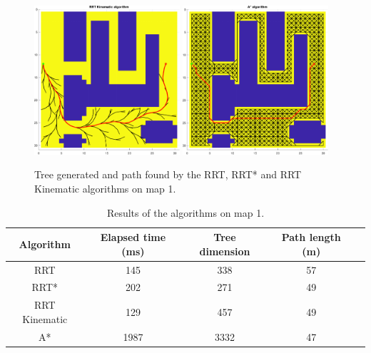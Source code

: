 \begin{figure}[H]
    \includegraphics[width=0.48\textwidth]{./img/MATLAB/testing/01_RRT Kinematic.pdf}
    \hspace{6pt}
    \includegraphics[width=0.48\textwidth]{./img/MATLAB/testing/01_A.pdf}
    \caption{Tree generated and path found by the RRT, RRT* and RRT Kinematic algorithms on map 1.}
    \label{fig:map_1_results}
\end{figure}

\begin{table}[H]
    \centering
    \begin{tabular}{|c|c|c|c|c|}
        \hline
        \textbf{Algorithm} & \textbf{Elapsed time (ms)} & \textbf{Tree dimension} & \textbf{Path length (m)} \\
        \hline
        RRT                & 145                        & 338                     & 57                       \\
        RRT*               & 202                        & 271                     & 49                       \\
        RRT Kinematic      & 129                        & 457                     & 49                       \\
        \hline
        A*                 & 1987                       & 3332                    & 47                       \\
        \hline
    \end{tabular}
    \caption{Results of the algorithms on map 1.}
    \label{tab:map_1_results}
\end{table}

